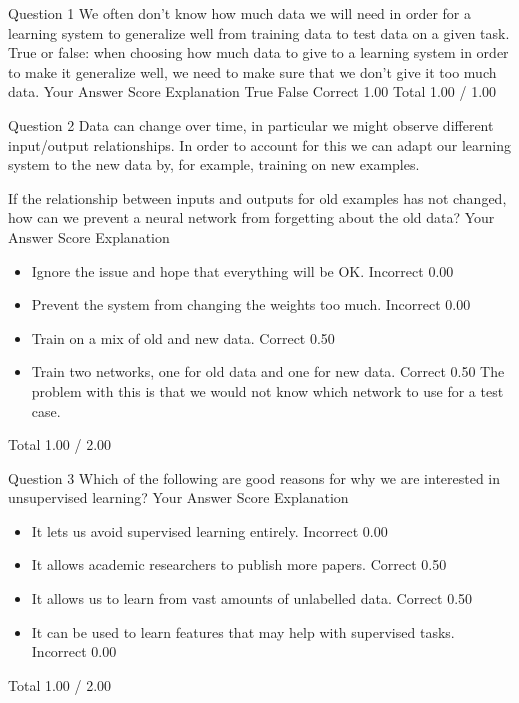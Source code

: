 Question 1
We often don't know how much data we will need in order for a learning system to generalize well from training data to test data on a given task. 
True or false: when choosing how much data to give to a learning system in order to make it generalize well, we need to make sure that we don't give it too much data.
Your Answer		Score	Explanation
True			
False	Correct	1.00	
Total		1.00 / 1.00	

Question 2
Data can change over time, in particular we might observe different input/output relationships. In order to account for this we can adapt our learning system to the new data by, for example, training on new examples. 

If the relationship between inputs and outputs for old examples has not changed, how can we prevent a neural network from forgetting about the old data?
Your Answer		Score	Explanation
\begin{itemize}
\item Ignore the issue and hope that everything will be OK.	Incorrect	0.00	
\item Prevent the system from changing the weights too much.	Incorrect	0.00	
\item Train on a mix of old and new data.	Correct	0.50	
\item Train two networks, one for old data and one for new data.	Correct	0.50	The problem with this is that we would not know which network to use for a test case.
\end{itemize}
Total		1.00 / 2.00	

Question 3
Which of the following are good reasons for why we are interested in unsupervised learning?
Your Answer		Score	Explanation
\begin{itemize}
\item It lets us avoid supervised learning entirely.	Incorrect	0.00	
\item It allows academic researchers to publish more papers.	Correct	0.50	
\item It allows us to learn from vast amounts of unlabelled data.	Correct	0.50	
\item It can be used to learn features that may help with supervised tasks.	Incorrect	0.00	
\end{itemize}
Total		1.00 / 2.00	

